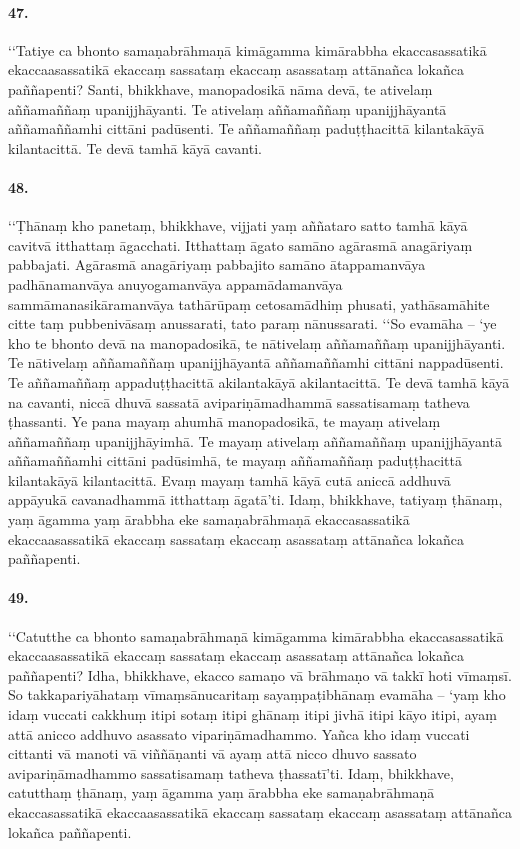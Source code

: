 \paragraph{47.}
‘‘Tatiye ca bhonto samaṇabrāhmaṇā kimāgamma kimārabbha ekaccasassatikā ekaccaasassatikā ekaccaṃ sassataṃ ekaccaṃ asassataṃ attānañca lokañca paññapenti? Santi, bhikkhave, manopadosikā nāma devā, te ativelaṃ aññamaññaṃ upanijjhāyanti. Te ativelaṃ aññamaññaṃ upanijjhāyantā aññamaññamhi cittāni padūsenti. Te aññamaññaṃ paduṭṭhacittā kilantakāyā kilantacittā. Te devā tamhā kāyā cavanti.

\paragraph{48.}
‘‘Ṭhānaṃ kho panetaṃ, bhikkhave, vijjati yaṃ aññataro satto tamhā kāyā cavitvā itthattaṃ āgacchati. Itthattaṃ āgato samāno agārasmā anagāriyaṃ pabbajati. Agārasmā anagāriyaṃ pabbajito samāno ātappamanvāya padhānamanvāya anuyogamanvāya appamādamanvāya sammāmanasikāramanvāya tathārūpaṃ cetosamādhiṃ phusati, yathāsamāhite citte taṃ pubbenivāsaṃ anussarati, tato paraṃ nānussarati. ‘‘So evamāha – ‘ye kho te bhonto devā na manopadosikā, te nātivelaṃ aññamaññaṃ upanijjhāyanti. Te nātivelaṃ aññamaññaṃ upanijjhāyantā aññamaññamhi cittāni nappadūsenti. Te aññamaññaṃ appaduṭṭhacittā akilantakāyā akilantacittā. Te devā tamhā kāyā na cavanti, niccā dhuvā sassatā avipariṇāmadhammā sassatisamaṃ tatheva ṭhassanti. Ye pana mayaṃ ahumhā manopadosikā, te mayaṃ ativelaṃ aññamaññaṃ upanijjhāyimhā. Te mayaṃ ativelaṃ aññamaññaṃ upanijjhāyantā aññamaññamhi cittāni padūsimhā, te mayaṃ aññamaññaṃ paduṭṭhacittā kilantakāyā kilantacittā. Evaṃ mayaṃ tamhā kāyā cutā aniccā addhuvā appāyukā cavanadhammā itthattaṃ āgatā’ti. Idaṃ, bhikkhave, tatiyaṃ ṭhānaṃ, yaṃ āgamma yaṃ ārabbha eke samaṇabrāhmaṇā ekaccasassatikā ekaccaasassatikā ekaccaṃ sassataṃ ekaccaṃ asassataṃ attānañca lokañca paññapenti.

\paragraph{49.}
‘‘Catutthe ca bhonto samaṇabrāhmaṇā kimāgamma kimārabbha ekaccasassatikā ekaccaasassatikā ekaccaṃ sassataṃ ekaccaṃ asassataṃ attānañca lokañca paññapenti? Idha, bhikkhave, ekacco samaṇo vā brāhmaṇo vā takkī hoti vīmaṃsī. So takkapariyāhataṃ vīmaṃsānucaritaṃ sayaṃpaṭibhānaṃ evamāha – ‘yaṃ kho idaṃ vuccati cakkhuṃ itipi sotaṃ itipi ghānaṃ itipi jivhā itipi kāyo itipi, ayaṃ attā anicco addhuvo asassato vipariṇāmadhammo. Yañca kho idaṃ vuccati cittanti vā manoti vā viññāṇanti vā ayaṃ attā nicco dhuvo sassato avipariṇāmadhammo sassatisamaṃ tatheva ṭhassatī’ti. Idaṃ, bhikkhave, catutthaṃ ṭhānaṃ, yaṃ āgamma yaṃ ārabbha eke samaṇabrāhmaṇā ekaccasassatikā ekaccaasassatikā ekaccaṃ sassataṃ ekaccaṃ asassataṃ attānañca lokañca paññapenti.

